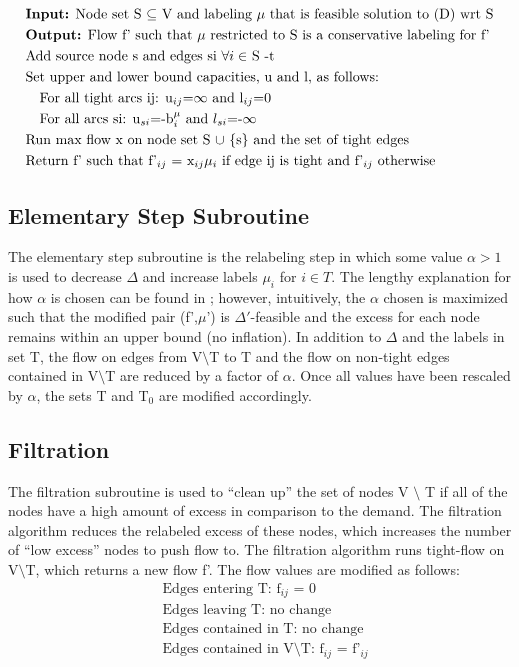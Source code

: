 \documentclass[11pt]{article}
\theoremstyle{definition}
\theoremstyle{definition}
\begin{document}
\begin{align*}
&\text{\textbf{Input:} Node set S $\subseteq$ V and labeling $\mu$ that is feasible solution to (D) wrt S} \\
&\text{\textbf{Output:} Flow f' such that $\mu$ restricted to S is a conservative labeling for f'} \\
&\text{Add source node s and edges si $\forall i \in$ S -t} \\
&\text{Set upper and lower bound capacities, u and l, as follows: } \\
&\quad \text{For all tight arcs ij: u$_{ij}$=$\infty$ and l$_{ij}$=0} \\
&\quad \text{For all arcs si: u$_{si}$=-b$_i^\mu$ and $l_{si}$=-$\infty$} \\
&\text{Run max flow x on node set S $\cup$ $\{$s$\}$ and the set of tight edges} \\
&\text{Return f' such that f'$_{ij}$ = x$_{ij}\mu_i$ if edge ij is tight and f'$_{ij}$ otherwise}
\end{align*}

\subsection{Elementary Step Subroutine}
The elementary step subroutine is the relabeling step in which some value $\alpha > 1$ is used to decrease $\Delta$ and increase labels $\mu_i$ for $i \in T$. The lengthy explanation for how $\alpha$ is chosen can be found in \cite{article}; however, intuitively, the $\alpha$ chosen is maximized such that the modified pair (f',$\mu$') is $\Delta'$-feasible and the excess for each node remains within an upper bound (no inflation). In addition to $\Delta$ and the labels in set T, the flow on edges from V$\setminus$T to T and the flow on non-tight edges contained in V$\setminus$T are reduced by a factor of $\alpha$. Once all values have been rescaled by $\alpha$, the sets T and T$_0$ are modified accordingly.  

\subsection{Filtration}
The filtration subroutine is used to ``clean up'' the set of nodes V $\setminus$ T if all of the nodes have a high amount of excess in comparison to the demand. The filtration algorithm reduces the relabeled excess of these nodes, which increases the number of ``low excess'' nodes to push flow to. The filtration algorithm runs tight-flow on V$\setminus$T, which returns a new flow f'. The flow values are modified as follows: 
\begin{align*}
&\text{Edges entering T: f$_{ij}$ = 0} \\ 
&\text{Edges leaving T: no change} \\
&\text{Edges contained in T: no change} \\
&\text{Edges contained in V$\setminus$T: f$_{ij}$ = f'$_{ij}$}
\end{align*}
\end{document}
